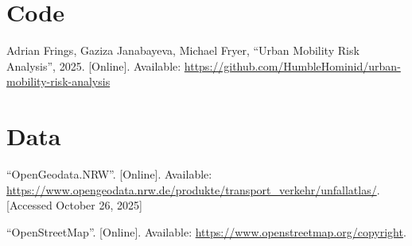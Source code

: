 \documentclass[10pt,a4paper]{article} %
\begin{document}
\section*{Code}
\begin{enumerate}[label={[\arabic*]},start=6]
    \item Adrian Frings, Gaziza Janabayeva, Michael Fryer, ``Urban Mobility Risk Analysis'', 2025. [Online]. Available: \url{https://github.com/HumbleHominid/urban-mobility-risk-analysis}
\end{enumerate}

\section*{Data}
\begin{enumerate}[label={[\arabic*]},start=7]
    \item ``OpenGeodata.NRW''. [Online]. Available: \url{https://www.opengeodata.nrw.de/produkte/transport_verkehr/unfallatlas/}. [Accessed October 26, 2025]
    \item ``OpenStreetMap''. [Online]. Available: \url{https://www.openstreetmap.org/copyright}.
\end{enumerate}

\end{document}
